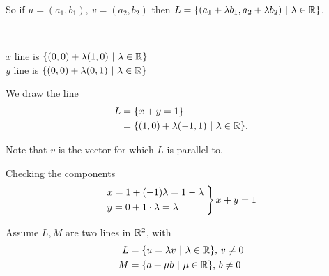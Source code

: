 \documentclass[10pt]{scrartcl}
\begin{document}
 So if $u = (a_1,b_1),~v = (a_2,b_2)$ then $L = \{(a_1 + \lambda b_1, a_2 + \lambda b_2) ~|~ \lambda \in \mathbb{R}\}$.\\


\begin{example}~\\

\begin{minipage}{7cm}
	\begin{center}
	
	\end{center}

\end{minipage}
\begin{minipage}{6cm}
	$x$ line is $\{(0,0) + \lambda(1,0) ~|~ \lambda \in \mathbb{R}\}$\\
	
	 $y$ line is $\{(0,0) + \lambda (0,1) ~|~ \lambda \in \mathbb{R}\}$
\end{minipage}

\vspace*{5pt}
We draw the line
  \begin{align*}L &= \{x+y = 1\}\\ &= \{(1,0) + \lambda(-1,1) ~|~ \lambda \in \mathbb{R}\}.\end{align*}
  
 Note that $v$ is the vector for which $L$ is parallel to.
 
Checking the components
\[
  \begin{rcases*}
  x = 1 + (-1)\lambda = 1-\lambda\;\\
  y = 0 + 1 \cdot \lambda = \lambda\; 	
  \end{rcases*}
  x+y  = 1
\]
\end{example}\vsp


Assume $L, M$ are two lines in $\mathbb{R}^2$, with \begin{align*}L &= \{ u = \lambda v ~|~ \lambda \in \mathbb{R}\},\,v \neq 0\\M &= \{a + \mu b ~|~ \mu \in \mathbb{R}\},\,b \neq 0\end{align*}
\end{document}
